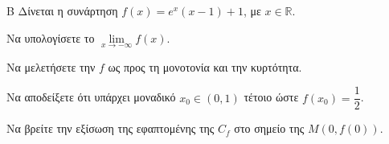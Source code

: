 \begin{thema}{Β}
Δίνεται η συνάρτηση $f(x) = e^x (x-1) + 1$, με $x \in \mathbb{R}$.
\begin{erwthma}
\item Να υπολογίσετε το $\lim\limits_{x \to -\infty} f(x)$.
\item Να μελετήσετε την $f$ ως προς τη μονοτονία και την κυρτότητα.
\item Να αποδείξετε ότι υπάρχει μοναδικό $x_0 \in (0, 1)$ τέτοιο ώστε $f(x_0) = \dfrac{1}{2}$.
\item Να βρείτε την εξίσωση της εφαπτομένης της $C_f$ στο σημείο της $M(0, f(0))$.
\end{erwthma}
\end{thema}
